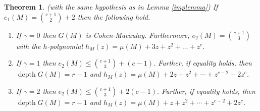 \documentclass[10pt,a4paper]{amsart}
\newtheorem{theorem}{Theorem}
\newcommand{\depth}{\operatorname{depth}}
\begin{document}
\begin{theorem}\label{main}
    (with the same hypothesis as in Lemma \ref{implemma}) If $e_1(M)=\binom{c+1}{2}+2$ then the following hold. 
     \begin{enumerate}
         \item \label{2+11} If $\gamma=0$ then $G(M)$ is Cohen-Macaulay. Furthermore,   $e_2(M)=\binom{c+1}{3}$ with the $h$-polynomial $h_M(z)=\mu(M)+3z+z^2+\ldots +z^c$. 
         \item \label{2+12}  If $\gamma=1$ then $e_2(M)\leq \binom{c+1}{3}+(c-1).$ Further, if equality holds, then $\depth G(M)= r-1$ and $h_M(z)=\mu(M)+2z+z^2+\cdots+z^{c-2}+2z^c$.
          \item \label{2+13} If $\gamma=2$ then $e_2(M)\leq \binom{c+1}{3}+2(c-1).$ Further, if equality holds, then $\depth G(M)= r-1$ and $h_M(z)= \mu(M)+z+z^2+\cdots+z^{c-2}+2z^c$.
     \end{enumerate} 
\end{theorem}
\end{document}
